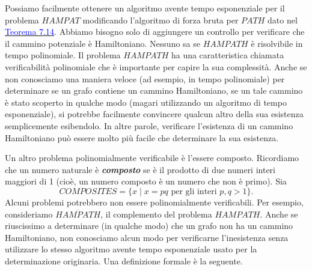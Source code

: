 \documentclass{article}
\begin{document}
Possiamo facilmente ottenere un algoritmo avente tempo esponenziale per il problema $HAMPAT$ modificando l'algoritmo di forza bruta per $PATH$ dato nel \hyperref[teorema-7.14]{\textcolor{blue}{Teorema 7.14}}. 
Abbiamo bisogno solo di aggiungere un controllo per verificare che il cammino potenziale è Hamiltoniano. 
Nessuno sa se $HAMPATH$ è risolvibile in tempo polinomiale.
Il problema $HAMPATH$ ha una caratteristica chiamata verificabilità polinomiale che è importante per capire la sua complessità. 
Anche se non conosciamo una maniera veloce (ad esempio, in tempo polinomiale) per determinare se un grafo contiene un cammino Hamiltoniano, se un tale cammino è stato scoperto in qualche modo (magari utilizzando un algoritmo di tempo esponenziale), si potrebbe facilmente convincere qualcun altro della sua esistenza semplicemente esibendolo. 
In altre parole, verificare l'esistenza di un cammino Hamiltoniano può essere molto più facile che determinare la sua esistenza.

Un altro problema polinomialmente verificabile è l'essere composto. 
Ricordiamo che un numero naturale è \textit{\textbf{composto}} se è il prodotto di due numeri interi maggiori di 1 (cioè, un numero composto è un numero che non è primo).
Sia
$$
COMPOSITES = \{ x \mid x = pq \text{ per gli interi } p,q > 1\}.
$$
Alcuni problemi potrebbero non essere polinomialmente verificabili.
Per esempio, consideriamo $\overline{HAMPATH}$, il complemento del problema $HAMPATH$. 
Anche se riuscissimo a determinare (in qualche modo) che un grafo non ha un cammino Hamiltoniano, non conosciamo alcun modo per verificarne l'inesistenza senza utilizzare lo stesso algoritmo avente tempo esponenziale usato per la determinazione originaria. 
Una definizione formale è la seguente.
\newpage
\end{document}
